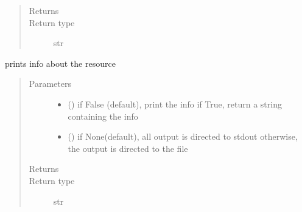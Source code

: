 \documentclass[letterpaper,10pt,english]{sphinxmanual}
\begin{document}
\begin{fulllineitems}
\begin{fulllineitems}
\begin{quote}
\begin{description}
\item[{Returns}] \leavevmode
{}

\item[{Return type}] \leavevmode
str

\end{description}\end{quote}

\end{fulllineitems}


\begin{fulllineitems}
\label{\detokenize{Reference:salabim.Resource.print_info}}
prints info about the resource
\begin{quote}\begin{description}
\item[{Parameters}] \leavevmode\begin{itemize}
\item {} 
 () \textendash{} if False (default), print the info
if True, return a string containing the info

\item {} 
 () \textendash{} if None(default), all output is directed to stdout 
otherwise, the output is directed to the file

\end{itemize}

\item[{Returns}] \leavevmode
{}

\item[{Return type}] \leavevmode
str

\end{description}\end{quote}

\end{fulllineitems}



\end{fulllineitems}
\end{document}
